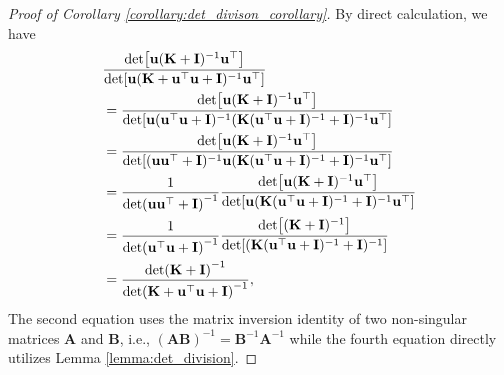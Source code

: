 \begin{proof} [Proof of Corollary \ref{corollary:det_divison_corollary}]
By direct calculation, we have
    \begin{align*}
        & \frac{\det[\mathbf{u}(\mathbf{K}+\mathbf{I})^{-1} \mathbf{u}^\top]}{\det [\mathbf{u}(\mathbf{K}+ \mathbf{u}^\top \mathbf{u} + \mathbf{I})^{-1} \mathbf{u}^\top]} \notag
        \\
        &= \frac{\det[\mathbf{u}(\mathbf{K}+\mathbf{I})^{-1} \mathbf{u}^\top]}{\det [\mathbf{u} (\mathbf{u}^\top \mathbf{u}+\mathbf{I})^{-1}(\mathbf{K} (\mathbf{u}^\top \mathbf{u} + \mathbf{I})^{-1} + \mathbf{I})^{-1} \mathbf{u}^\top]}
        \\
        &=\frac{\det[\mathbf{u}(\mathbf{K}+\mathbf{I})^{-1} \mathbf{u}^\top]}{\det [ (\mathbf{u} \mathbf{u}^\top+\mathbf{I})^{-1}\mathbf{u} (\mathbf{K} (\mathbf{u}^\top \mathbf{u} + \mathbf{I})^{-1} + \mathbf{I})^{-1} \mathbf{u}^\top]}
        \\
        &= \frac{1}{\det (\mathbf{u} \mathbf{u}^\top+\mathbf{I})^{-1}} \frac{\det[\mathbf{u}(\mathbf{K}+\mathbf{I})^{-1} \mathbf{u}^\top]}{\det [\mathbf{u} (\mathbf{K} (\mathbf{u}^\top \mathbf{u} + \mathbf{I})^{-1} + \mathbf{I})^{-1} \mathbf{u}^\top]}
        \\
        &=\frac{1}{\det (\mathbf{u} ^\top \mathbf{u}+\mathbf{I})^{-1}} \frac{\det[(\mathbf{K}+\mathbf{I})^{-1}]}{\det [ (\mathbf{K} (\mathbf{u}^\top \mathbf{u} + \mathbf{I})^{-1} + \mathbf{I})^{-1}]}
        \\
        &= \frac{\det (\mathbf{K}+\mathbf{I})^{-1}}{\det(\mathbf{K}+\mathbf{u}^\top \mathbf{u}+\mathbf{I})^{-1}},
    \end{align*}
The second equation uses the matrix inversion identity of two non-singular matrices $\mathbf{A}$ and $\mathbf{B}$, i.e., $(\mathbf{A}\mathbf{B})^{-1} = \mathbf{B}^{-1} \mathbf{A}^{-1}$ while the fourth equation directly utilizes Lemma \ref{lemma:det_division}.
\end{proof}

